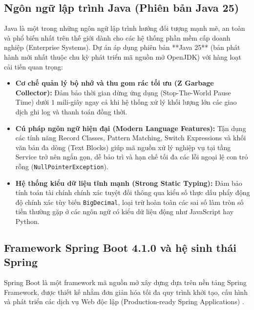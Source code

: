 \subsection{Ngôn ngữ lập trình Java (Phiên bản Java 25)}
Java là một trong những ngôn ngữ lập trình hướng đối tượng mạnh mẽ, an toàn và phổ biến nhất trên thế giới dành cho các hệ thống phần mềm cấp doanh nghiệp (Enterprise Systems). Dự án áp dụng phiên bản **Java 25** (bản phát hành mới nhất thuộc chu kỳ phát triển mã nguồn mở OpenJDK) với hàng loạt cải tiến quan trọng:
\begin{itemize}[leftmargin=1.5cm]
    \item \textbf{Cơ chế quản lý bộ nhớ và thu gom rác tối ưu (Z Garbage Collector):} Đảm bảo thời gian dừng ứng dụng (Stop-The-World Pause Time) dưới $1$ mili-giây ngay cả khi hệ thống xử lý khối lượng lớn các giao dịch ghi log và thanh toán đồng thời.
    \item \textbf{Cú pháp ngôn ngữ hiện đại (Modern Language Features):} Tận dụng các tính năng Record Classes, Pattern Matching, Switch Expressions và khối văn bản đa dòng (Text Blocks) giúp mã nguồn xử lý nghiệp vụ tại tầng Service trở nên ngắn gọn, dễ bảo trì và hạn chế tối đa các lỗi ngoại lệ con trỏ rỗng (\texttt{NullPointerException}).
    \item \textbf{Hệ thống kiểu dữ liệu tĩnh mạnh (Strong Static Typing):} Đảm bảo tính toán tài chính chính xác tuyệt đối thông qua kiểu số thực dấu phẩy động độ chính xác tùy biến \texttt{BigDecimal}, loại trừ hoàn toàn các sai số làm tròn số tiền thường gặp ở các ngôn ngữ có kiểu dữ liệu động như JavaScript hay Python.
\end{itemize}

\subsection{Framework Spring Boot 4.1.0 và hệ sinh thái Spring}
Spring Boot là một framework mã nguồn mở xây dựng dựa trên nền tảng Spring Framework, được thiết kế nhằm đơn giản hóa tối đa quy trình khởi tạo, cấu hình và phát triển các dịch vụ Web độc lập (Production-ready Spring Applications) \cite{walls2022}. 

